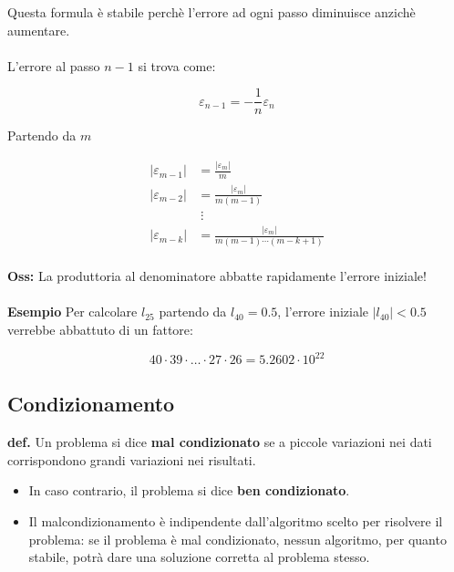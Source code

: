 \documentclass[a4paper, 11pt]{article}
\begin{document}
        Questa formula è stabile perchè l'errore ad ogni passo diminuisce anzichè aumentare.

        \paragraph{}
        L'errore al passo \( n-1 \) si trova come:


        \[
            \varepsilon_{n-1} = -\frac{1}{n} \varepsilon_n
        \]

        Partendo da \( m \)


        \[
        \begin{aligned}
            |\varepsilon_{m-1}| &= \frac{|\varepsilon_m|}{m} \\
            |\varepsilon_{m-2}| &= \frac{|\varepsilon_m|}{m(m-1)} \\
            &\;\vdots \\
            |\varepsilon_{m-k}| &= \frac{|\varepsilon_m|}{m(m-1)\cdots(m-k+1)}
        \end{aligned}
        \]

        \paragraph{}
        \textbf{Oss: } La produttoria al denominatore abbatte rapidamente l'errore iniziale!

        \paragraph{}
        \textbf{Esempio}
        Per calcolare \( l_{25} \) partendo da \( l_{40} = 0.5 \), l'errore iniziale \( |l_{40}| < 0.5 \) verrebbe abbattuto di un fattore:


        \[
        40 \cdot 39 \cdot \ldots \cdot 27 \cdot 26 = 5.2602 \cdot 10^{22}
        \]

        \subsection{Condizionamento}
        \textbf{def. }Un problema si dice \textbf{mal condizionato} se a piccole variazioni nei dati corrispondono grandi variazioni nei risultati.

        \begin{itemize}
            \item In caso contrario, il problema si dice \textbf{ben condizionato}.
            \item Il malcondizionamento è indipendente dall’algoritmo scelto per risolvere il problema: se il problema è mal condizionato, nessun algoritmo, per quanto stabile, potrà dare una soluzione corretta al problema stesso.
        \end{itemize}
\end{document}
